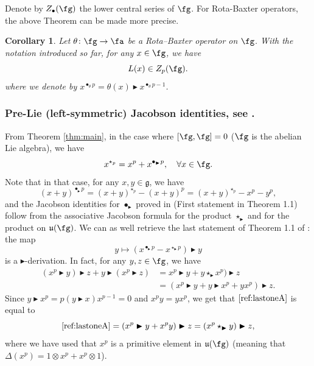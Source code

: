 \documentclass[12pt]{article}
\newcommand{\btr}{\blacktriangleright}
\newtheorem{corollary}[theorem]{Corollary}
\begin{document}
Denote by $Z_{\bullet}(\fg)$ the lower central series of $\fg$. For Rota-Baxter operators, the above Theorem can be made more precise.
\begin{corollary} 
\label{thm:mainrb}
Let $\theta\colon \fg \to \fa$ be a Rota--Baxter operator on $\fg$. With the notation introduced so far, for any $x \in \fg$, we have
\begin{equation}
L(x) \in Z_{p}(\fg).
\end{equation}
where we denote by $x^{\bullet_{\theta} p} = \theta(x)\btr x^{\bullet_{\theta} p-1} $.
\end{corollary}



\subsubsection{Pre-Lie (left-symmetric) Jacobson identities,  see \cite{asqar}.}\label{sec:preliejacobson}
From Theorem \ref{thm:main}, in the case where $[\fg,\fg]=0$ ($\fg$ is the abelian Lie algebra), we have
\begin{equation}
x^{\star_{p}} = x^{p} + x^{\bullet_{\btr} p},\quad\forall x\in\fg.
\end{equation}
Note that in that case, for any $x,y \in \mathfrak{g}$, we have
\begin{equation}
(x+y)^{\bullet_{\btr} p} = (x+y)^{\star_{p}} - (x+y)^{p} = (x+y)^{\star_{p}} - x^{p} - y^{p},
\end{equation}
and the Jacobson identities for $\bullet_{\btr}$ proved in \cite{asqar} (First statement in Theorem 1.1) follow from the associative Jacobson formula for the product $\star_{\btr}$ and for the product on $\mathfrak{u}(\fg)$. We can as well retrieve the last statement of Theorem 1.1 of \cite{asqar}: the map
$$
y \mapsto (x^{\bullet_{\btr} p} - x^{\star_{\btr}p}) \btr y
$$
is a ${\btr}$-derivation. In fact, for any $y,z\in \fg$, we have
\begin{align}
(x^p\btr y) \btr z + y \btr( x^p \btr z) &= x^p\btr y + y\star_{\btr}x^p)\btr z \nonumber \\
&=(x^p \btr y + y\btr x^p + yx^p)\btr z. \label{ref:lastoneA}
\end{align}
Since 
$y\btr x^p = p (y\btr x) x^{p-1} = 0$ and $x^py=yx^p$, we get that $\eqref{ref:lastoneA}$ is equal to 
$$
\eqref{ref:lastoneA}= (x^p \btr y + x^py) \btr z = (x^p \star_{\btr} y) \btr z,
$$
where we have used that $x^p$ is a primitive element in $\mathfrak{u}(\fg)$ (meaning that $\Delta(x^{p})=1\otimes x^{p} + x^{p}\otimes 1$). 
\end{document}
